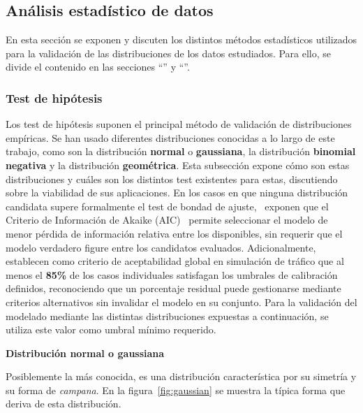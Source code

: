 \subsection{Análisis estadístico de datos}\label{subsec:statistics}
En esta sección se exponen y discuten los distintos métodos estadísticos utilizados para la validación
de las distribuciones de los datos estudiados. Para ello, se divide el contenido en las secciones
\enquote{} y \enquote{}. 


\subsubsection{Test de hipótesis}\label{subsubsec:hyp_test}
Los test de hipótesis suponen el principal método de validación de distribuciones empíricas. 
Se han usado diferentes distribuciones conocidas a lo largo de este trabajo, como son la 
distribución \textbf{normal} o \textbf{gaussiana}, la distribución \textbf{binomial negativa} 
y la distribución \textbf{geométrica}. Esta subsección expone cómo son estas distribuciones 
y cuáles son los distintos test existentes para estas, discutiendo sobre la viabilidad de sus 
aplicaciones. En los casos en que ninguna distribución candidata supere formalmente el test de 
bondad de ajuste,~\textcite{burnham2002model} exponen que el Criterio de Información de 
Akaike (AIC)~\cite{akaike1974new} permite seleccionar el modelo de menor pérdida de información relativa entre los 
disponibles, sin requerir que el modelo verdadero figure entre los candidatos evaluados. 
Adicionalmente,~\textcite{dowling2004toolbox} establecen como criterio de aceptabilidad global 
en simulación de tráfico que al menos el \textbf{85\%} de los casos individuales satisfagan los 
umbrales de calibración definidos, reconociendo que un porcentaje residual puede gestionarse 
mediante criterios alternativos sin invalidar el modelo en su conjunto. Para la validación del 
modelado mediante las distintas distribuciones expuestas a continuación, se utiliza este valor como umbral
mínimo requerido.

\medskip
\noindent\textbf{Distribución normal o gaussiana}

Posiblemente la más conocida, es una distribución característica por su simetría y su forma de \textit{campana}.
En la figura~\ref{fig:gaussian} se muestra la típica forma que deriva de esta distribución.

